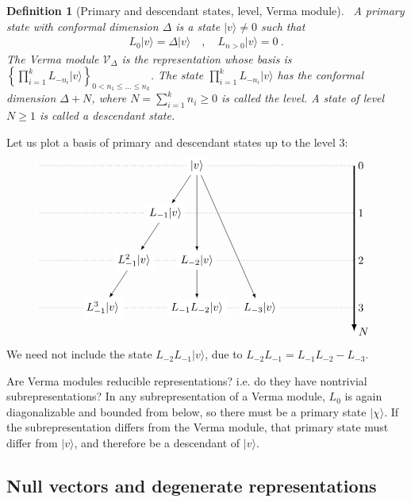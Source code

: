 \documentclass[12pt, a4paper]{article}
\theoremstyle{break}
\newtheorem{defn}[exo]{Definition}
\begin{document}
\begin{defn}[Primary and descendant states, level, Verma module]
 ~\label{def:prim}
 A primary state with conformal dimension $\Delta$ is a state $|v\rangle\neq 0$ such that 
 \begin{align}
  L_0 |v\rangle = \Delta |v\rangle \quad , \quad L_{n>0} |v\rangle = 0\ .
 \end{align}
The Verma module $\mathcal V_\Delta$ is the representation whose basis is 
 $
 \left\{ \prod_{i=1}^k L_{-n_i} |v\rangle\right\}_{ 0<n_1\leq \dots \leq n_k}
 $.
The state $\prod_{i=1}^k L_{-n_i} |v\rangle $ has the conformal dimension $\Delta+N$, where $N=\sum_{i=1}^k n_i\geq 0$ is called the level. A state of level $N\geq 1$ is called a descendant state.
\end{defn}
Let us plot a basis of primary and descendant states up to the level $3$:
\begin{align}
 \begin{tikzpicture}[scale = .25, baseline=(current  bounding  box.center)]
  \draw[-latex, very thick] (20, 0) -- (20, -21) node [right] {$N$};
  \foreach \x in {0, ..., 3}
  {
  \draw [dotted] (-20, {-6*\x}) -- (20, {-6*\x}) node [right] {${\x}$};
  }
  \node[fill = white] at (0, 0) (0) {$|v\rangle$};
  \node[fill = white] at (-4,-6) (1) {$L_{-1}|v\rangle$};
  \node[fill = white] at (-8, -12) (11) {$L_{-1}^2|v\rangle$};
  \node[fill = white] at (-12, -18) (111) {$L_{-1}^3|v\rangle$};
  \node[fill = white] at (0,-12) (2) {$L_{-2}|v\rangle$};
  \node[fill = white] at (0,-18) (12) {$L_{-1}L_{-2}|v\rangle$};
  \node[fill = white] at (8,-18) (3) {$L_{-3}|v\rangle$};
  \draw[-latex] (0) -- (1);
  \draw[-latex] (1) -- (11);
  \draw[-latex] (11) -- (111);
  \draw[-latex] (0) -- (2);
  \draw[-latex] (0) -- (3);
  \draw[-latex] (2) -- (12);
 \end{tikzpicture}
\end{align}
We need not include the state $L_{-2}L_{-1}|v\rangle$, due to $L_{-2}L_{-1} = L_{-1}L_{-2} - L_{-3}$.

Are Verma modules reducible representations? i.e. do they have nontrivial subrepresentations? In any subrepresentation of a Verma module, $L_0$ is again diagonalizable and bounded from below, so there must be a primary state $|\chi\rangle$. If the subrepresentation differs from the Verma module, that primary state must differ from $|v\rangle$, and therefore be a descendant of $|v\rangle$.


\subsection{Null vectors and degenerate representations}\label{sec:nv}
\end{document}
